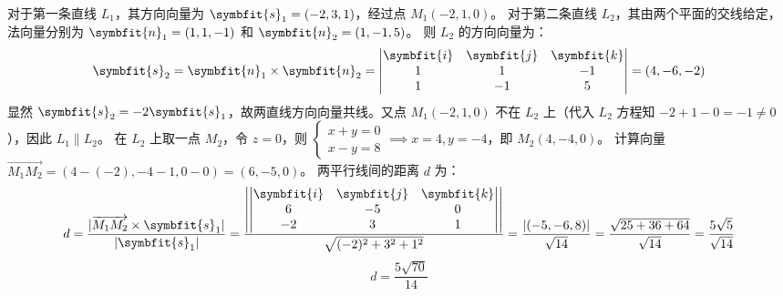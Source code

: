 \begin{solution}

    对于第一条直线 $L_1$，其方向向量为 $\symbfit{s}_1 = (-2, 3, 1)$，经过点 $M_1(-2, 1, 0)$。
    对于第二条直线 $L_2$，其由两个平面的交线给定，法向量分别为 $\symbfit{n}_1 = (1, 1, -1)$ 和 $\symbfit{n}_2 = (1, -1, 5)$。
    则 $L_2$ 的方向向量为：
    \begin{equation*}
        \symbfit{s}_2 = \symbfit{n}_1 \times \symbfit{n}_2 = \begin{vmatrix} \symbfit{i} & \symbfit{j} & \symbfit{k} \\ 1 & 1 & -1 \\ 1 & -1 & 5 \end{vmatrix} = (4, -6, -2)
    \end{equation*}
    显然 $\symbfit{s}_2 = -2 \symbfit{s}_1$，故两直线方向向量共线。又点 $M_1(-2, 1, 0)$ 不在 $L_2$ 上（代入 $L_2$ 方程知 $-2+1-0 = -1 \neq 0$），因此 $L_1 \parallel L_2$。
    在 $L_2$ 上取一点 $M_2$，令 $z=0$，则 $\begin{cases} x+y=0 \\ x-y=8 \end{cases} \implies x=4, y=-4$，即 $M_2(4, -4, 0)$。
    计算向量 $\overrightarrow{M_1 M_2} = (4 - (-2), -4 - 1, 0 - 0) = (6, -5, 0)$。
    两平行线间的距离 $d$ 为：
    \begin{equation*}
        d = \frac{|\overrightarrow{M_1 M_2} \times \symbfit{s}_1|}{|\symbfit{s}_1|} = \frac{\left| \begin{vmatrix} \symbfit{i} & \symbfit{j} & \symbfit{k} \\ 6 & -5 & 0 \\ -2 & 3 & 1 \end{vmatrix} \right|}{\sqrt{(-2)^2 + 3^2 + 1^2}} = \frac{|(-5, -6, 8)|}{\sqrt{14}} = \frac{\sqrt{25 + 36 + 64}}{\sqrt{14}} = \frac{5\sqrt{5}}{\sqrt{14}}
    \end{equation*}
    \begin{equation*}
        \boxed{d = \frac{5\sqrt{70}}{14}}
    \end{equation*}



\end{solution}

